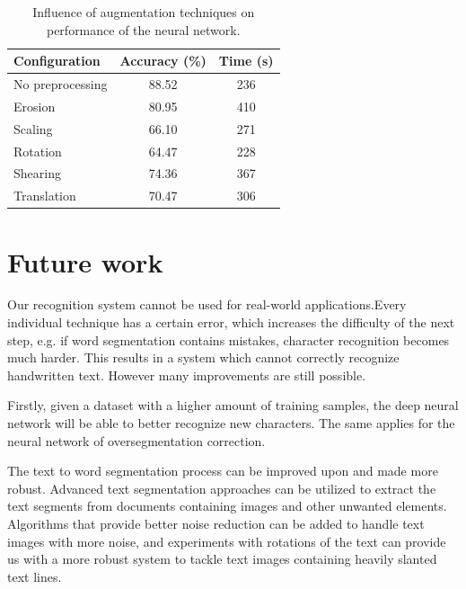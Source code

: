 \documentclass{article}
\begin{document}
\begin{table}
\caption{Influence of augmentation techniques on performance of the neural network.}
\label{tab:preprocess}
\vskip 0.15in
\begin{center}
\begin{small}
\begin{sc}
\begin{tabular}{lcc}
\hline
\abovespace\belowspace
Configuration & Accuracy (\%) & Time (s) \\
\hline
\abovespace
No preprocessing & 88.52 & 236 \\
Erosion & 80.95 & 410 \\
Scaling & 66.10 & 271 \\
Rotation & 64.47 & 228 \\
Shearing & 74.36 & 367 \\
Translation & 70.47 & 306 \\
\hline
\end{tabular}
\end{sc}
\end{small}
\end{center}
\vskip -0.1in
\end{table}


\section{Future work}
Our recognition system cannot be used for real-world applications.Every individual technique has a certain error, which increases the difficulty of the next step, e.g. if word segmentation contains mistakes, character recognition becomes much harder.
This results in a system which cannot correctly recognize handwritten text.
However many improvements are still possible.

Firstly, given a dataset with a higher amount of training samples, the deep neural network will be able to better recognize new characters. The same applies for the neural network of oversegmentation correction.

The text to word segmentation process can be improved upon and made more robust. 
Advanced text segmentation approaches can be utilized to extract the text segments from documents containing images and other unwanted elements.
Algorithms that provide better noise reduction can be added to handle text images with more noise, 
and experiments with rotations of the text can provide us with a more robust system to tackle text images containing heavily slanted text lines.
\end{document}
